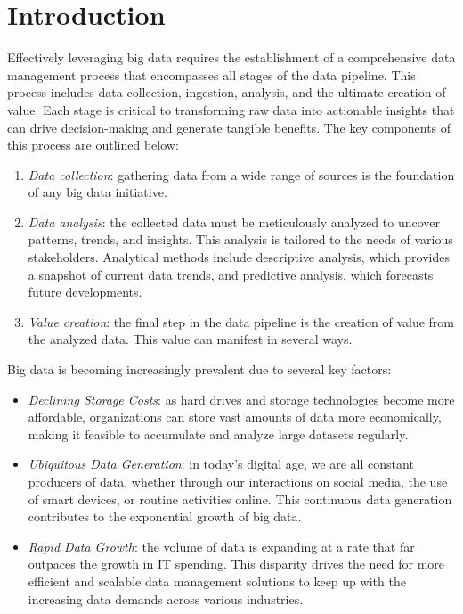 \section{Introduction}

Effectively leveraging big data requires the establishment of a comprehensive data management process that encompasses all stages of the data pipeline. 
This process includes data collection, ingestion, analysis, and the ultimate creation of value. 
Each stage is critical to transforming raw data into actionable insights that can drive decision-making and generate tangible benefits. 
The key components of this process are outlined below:
\begin{enumerate}
    \item \textit{Data collection}: gathering data from a wide range of sources is the foundation of any big data initiative. 
    \item \textit{Data analysis}: the collected data must be meticulously analyzed to uncover patterns, trends, and insights. 
        This analysis is tailored to the needs of various stakeholders.
        Analytical methods include descriptive analysis, which provides a snapshot of current data trends, and predictive analysis, which forecasts future developments.
    \item \textit{Value creation}: the final step in the data pipeline is the creation of value from the analyzed data. 
        This value can manifest in several ways.
\end{enumerate} 
Big data is becoming increasingly prevalent due to several key factors:
\begin{itemize}
    \item \textit{Declining Storage Costs}: as hard drives and storage technologies become more affordable, organizations can store vast amounts of data more economically, making it feasible to accumulate and analyze large datasets regularly.
    \item \textit{Ubiquitous Data Generation}: in today's digital age, we are all constant producers of data, whether through our interactions on social media, the use of smart devices, or routine activities online. 
        This continuous data generation contributes to the exponential growth of big data.
    \item \textit{Rapid Data Growth}: the volume of data is expanding at a rate that far outpaces the growth in IT spending. 
        This disparity drives the need for more efficient and scalable data management solutions to keep up with the increasing data demands across various industries.
\end{itemize}
